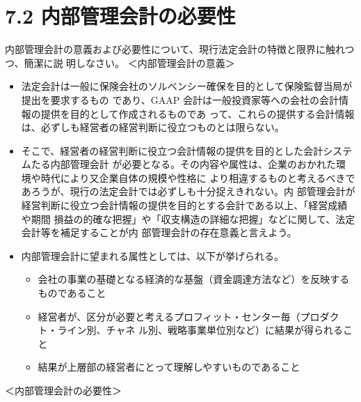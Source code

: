\documentclass[report,gutter=10mm,fore-edge=10mm,uplatex,dvipdfmx]{jlreq}
\begin{document}
\section{7.2 内部管理会計の必要性}
内部管理会計の意義および必要性について、現行法定会計の特徴と限界に触れつつ、簡潔に説
明しなさい。
\answer{}
＜内部管理会計の意義＞
\begin{itemize}
 \item[] 法定会計は一般に保険会社のソルベンシー確保を目的として保険監督当局が提出を要求するもの
 であり、GAAP 会計は一般投資家等への会社の会計情報の提供を目的として作成されるものであ
 って、これらの提供する会計情報は、必ずしも経営者の経営判断に役立つものとは限らない。
 \item[] そこで、経営者の経営判断に役立つ会計情報の提供を目的とした会計システムたる内部管理会計
 が必要となる。その内容や属性は、企業のおかれた環境や時代により又企業自体の規模や性格に
 より相違するものと考えるべきであろうが、現行の法定会計では必ずしも十分捉えきれない。内
 部管理会計が経営判断に役立つ会計情報の提供を目的とする会計である以上、「経営成績や期間
 損益の的確な把握」や「収支構造の詳細な把握」などに関して、法定会計等を補足することが内
 部管理会計の存在意義と言えよう。
 \item[] 内部管理会計に望まれる属性としては、以下が挙げられる。
\begin{itemize}
  \item[] 会社の事業の基礎となる経済的な基盤（資金調達方法など）を反映するものであること
 \item[] 経営者が、区分が必要と考えるプロフィット・センター毎（プロダクト・ライン別、チャネ
 ル別、戦略事業単位別など）に結果が得られること
 \item[] 結果が上層部の経営者にとって理解しやすいものであること
\end{itemize}
\end{itemize}
＜内部管理会計の必要性＞
\end{document}
